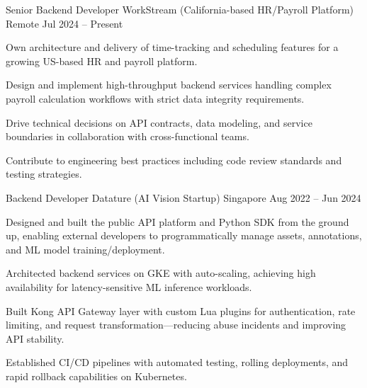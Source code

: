 
\begin{cventries}
  \cventry
    {Senior Backend Developer}
    {WorkStream (California-based HR/Payroll Platform)}
    {Remote}
    {Jul 2024 -- Present}
    {
      \begin{cvitems}
        \item {Own architecture and delivery of time-tracking and scheduling features for a growing US-based HR and payroll platform.}
        \item {Design and implement high-throughput backend services handling complex payroll calculation workflows with strict data integrity requirements.}
        \item {Drive technical decisions on API contracts, data modeling, and service boundaries in collaboration with cross-functional teams.}
        \item {Contribute to engineering best practices including code review standards and testing strategies.}
      \end{cvitems}
    }

  \cventry
    {Backend Developer}
    {Datature (AI Vision Startup)}
    {Singapore}
    {Aug 2022 -- Jun 2024}
    {
      \begin{cvitems}
        \item {Designed and built the public API platform and Python SDK from the ground up, enabling external developers to programmatically manage assets, annotations, and ML model training/deployment.}
        \item {Architected backend services on GKE with auto-scaling, achieving high availability for latency-sensitive ML inference workloads.}
        \item {Built Kong API Gateway layer with custom Lua plugins for authentication, rate limiting, and request transformation---reducing abuse incidents and improving API stability.}
        \item {Established CI/CD pipelines with automated testing, rolling deployments, and rapid rollback capabilities on Kubernetes.}
      \end{cvitems}
    }


\end{cventries}
